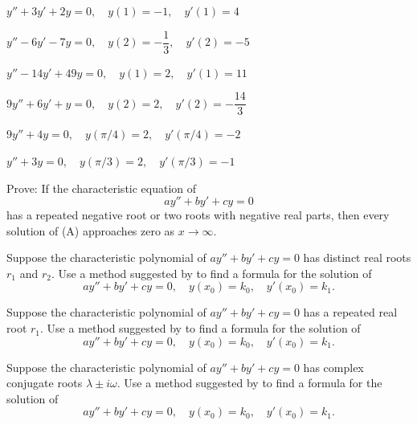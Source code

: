 \begin{exerciselist}

\item\label{exer:5.2.23}$y''+3y'+2y=0, \quad  y(1)=-1,\quad y'(1)=4$

\item\label{exer:5.2.24}$y''-6y'-7y=0, \quad  y(2)=-\dfrac{1}{3},\quad y'(2)=-5$

\item\label{exer:5.2.25}$y''-14y'+49y=0, \quad  y(1)=2,\quad y'(1)=11$

\item\label{exer:5.2.26}$9y''+6y'+y=0, \quad  y(2)=2,\quad y'(2)=-\dfrac{14}{3}$

\item\label{exer:5.2.27}$9y''+4y=0, \quad  y(\pi/4)=2,\quad y'(\pi/4)=-2$

\item\label{exer:5.2.28}$y''+3y=0, \quad  y(\pi/3)=2,\quad y'(\pi/3)=-1$

\item\label{exer:5.2.29}Prove: If the characteristic equation of
\[
ay''+by'+cy=0
\tag{A}
\]
has a repeated negative root or two roots with negative real parts, then
every solution of  (A) approaches zero as $x\to\infty$.

\item\label{exer:5.2.30}Suppose the characteristic polynomial of $ay''+by'+cy=0$
 has distinct real roots $r_1$ and $r_2$. Use a method suggested
by   to find a formula for the solution
of
\[
ay''+by'+cy=0, \quad  y(x_0)=k_0,\quad y'(x_0)=k_1.
\]

\item\label{exer:5.2.31}Suppose the characteristic polynomial of $ay''+by'+cy=0$ has a
repeated real root $r_1$. Use a method suggested by
 to find a formula for the solution of
\[
ay''+by'+cy=0, \quad  y(x_0)=k_0,\quad y'(x_0)=k_1.
\]

\item\label{exer:5.2.32}Suppose the characteristic polynomial of $ay''+by'+cy=0$ has
complex conjugate roots $\lambda\pm i\omega$. Use a method suggested
by  to find a formula for the solution of
\[
ay''+by'+cy=0, \quad  y(x_0)=k_0,\quad y'(x_0)=k_1.
\]


\end{exerciselist}
